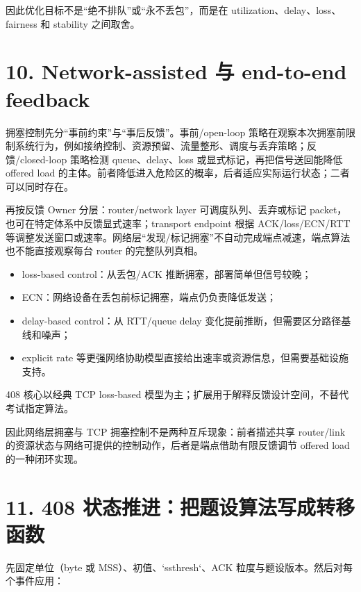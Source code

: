 \documentclass[UTF8,fontset=none,11pt,a4paper]{ctexart}
\providecommand{\tightlist}{\setlength{\itemsep}{0pt}\setlength{\parskip}{0pt}}
\begin{document}
因此优化目标不是``绝不排队''或``永不丢包''，而是在
utilization、delay、loss、fairness 和 stability 之间取舍。

\section{10. Network-assisted 与 end-to-end
feedback}\label{10-network-assisted-ux4e0e-end-to-end-feedback}

拥塞控制先分“事前约束”与“事后反馈”。事前/open-loop 策略在观察本次拥塞前限制系统行为，例如接纳控制、资源预留、流量整形、调度与丢弃策略；反馈/closed-loop 策略检测 queue、delay、loss 或显式标记，再把信号送回能降低 offered load 的主体。前者降低进入危险区的概率，后者适应实际运行状态；二者可以同时存在。

再按反馈 Owner 分层：router/network layer 可调度队列、丢弃或标记 packet，也可在特定体系中反馈显式速率；transport endpoint 根据 ACK/loss/ECN/RTT 等调整发送窗口或速率。网络层“发现/标记拥塞”不自动完成端点减速，端点算法也不能直接观察每台 router 的完整队列真相。

\begin{itemize}
\tightlist
\item
  loss-based control：从丢包/ACK 推断拥塞，部署简单但信号较晚；
\item
  ECN：网络设备在丢包前标记拥塞，端点仍负责降低发送；
\item
  delay-based control：从 RTT/queue delay
  变化提前推断，但需要区分路径基线和噪声；
\item
  explicit rate
  等更强网络协助模型直接给出速率或资源信息，但需要基础设施支持。
\end{itemize}

408 核心以经典 TCP loss-based
模型为主；扩展用于解释反馈设计空间，不替代考试指定算法。

因此网络层拥塞与 TCP 拥塞控制不是两种互斥现象：前者描述共享 router/link 的资源状态与网络可提供的控制动作，后者是端点借助有限反馈调节 offered load 的一种闭环实现。

\section{11. 408 状态推进：把题设算法写成转移函数}

先固定单位（byte 或 MSS）、初值、`ssthresh`、ACK 粒度与题设版本。然后对每个事件应用：
\end{document}

